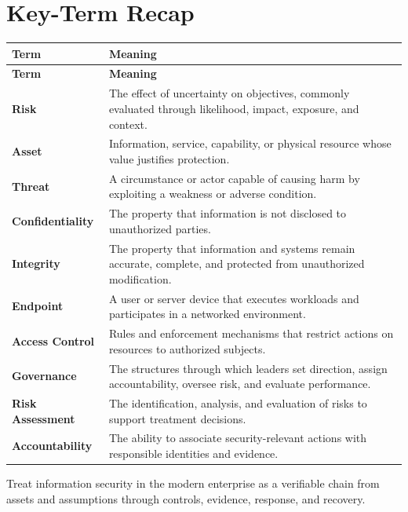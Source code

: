 \documentclass[11pt]{article}
\begin{document}
\section*{Key-Term Recap}
\begin{longtable}{>{\RaggedRight\arraybackslash}p{}>{\RaggedRight\arraybackslash}p{}}
\toprule\rowcolor{Navy}\color{white}\textbf{Term} & \color{white}\textbf{Meaning}\\\midrule
\endfirsthead
\toprule\rowcolor{Navy}\color{white}\textbf{Term} & \color{white}\textbf{Meaning}\\\midrule
\endhead
\textbf{Risk} & The effect of uncertainty on objectives, commonly evaluated through likelihood, impact, exposure, and context. \\\midrule
\textbf{Asset} & Information, service, capability, or physical resource whose value justifies protection. \\\midrule
\textbf{Threat} & A circumstance or actor capable of causing harm by exploiting a weakness or adverse condition. \\\midrule
\textbf{Confidentiality} & The property that information is not disclosed to unauthorized parties. \\\midrule
\textbf{Integrity} & The property that information and systems remain accurate, complete, and protected from unauthorized modification. \\\midrule
\textbf{Endpoint} & A user or server device that executes workloads and participates in a networked environment. \\\midrule
\textbf{Access Control} & Rules and enforcement mechanisms that restrict actions on resources to authorized subjects. \\\midrule
\textbf{Governance} & The structures through which leaders set direction, assign accountability, oversee risk, and evaluate performance. \\\midrule
\textbf{Risk Assessment} & The identification, analysis, and evaluation of risks to support treatment decisions. \\\midrule
\textbf{Accountability} & The ability to associate security-relevant actions with responsible identities and evidence. \\\midrule
\bottomrule
\end{longtable}
\begin{takeawaybox}
Treat information security in the modern enterprise as a verifiable chain from assets and assumptions through controls, evidence, response, and recovery.
\end{takeawaybox}
\end{document}
